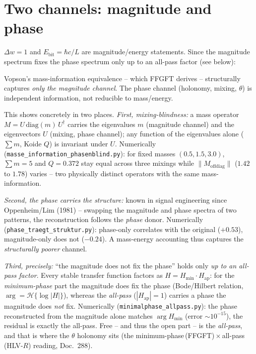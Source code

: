 \section{Two channels: magnitude and phase}
$\Delta w=1$ and $E_\text{bit}=\hbar c/L$ are magnitude/energy statements. Since the magnitude spectrum
fixes the phase spectrum only up to an all-pass factor (see below):

Vopson's mass-information equivalence -- which FFGFT derives -- structurally captures \emph{only the
magnitude channel}. The phase channel (holonomy, mixing, $\theta$) is independent information, not
reducible to mass/energy.

This shows concretely in two places. \emph{First, mixing-blindness:} a mass operator
$M=U\,\mathrm{diag}(m)\,U^{\dagger}$ carries the eigenvalues $m$ (magnitude channel) and the eigenvectors
$U$ (mixing, phase channel); any function of the eigenvalues alone ($\sum m$, Koide $Q$) is invariant
under $U$. Numerically (\texttt{masse\_information\_phasenblind.py}): for fixed masses $(0.5,1.5,3.0)$,
$\sum m=5$ and $Q=0.372$ stay equal across three mixings while $\lVert M_\text{offdiag}\rVert$ ($1.42$ to
$1.78$) varies -- two physically distinct operators with the same mass-information.

\emph{Second, the phase carries the structure:} known in signal engineering since Oppenheim/Lim (1981) --
swapping the magnitude and phase spectra of two patterns, the reconstruction follows the \emph{phase}
donor. Numerically (\texttt{phase\_traegt\_struktur.py}): phase-only correlates with the original
($+0.53$), magnitude-only does not ($-0.24$). A mass-energy accounting thus captures the
\emph{structurally poorer} channel.

\emph{Third, precisely:} \enquote{the magnitude does not fix the phase} holds only \emph{up to an
all-pass factor}. Every stable transfer function factors as $H=H_\text{min}\cdot H_\text{ap}$: for the
\emph{minimum-phase} part the magnitude does fix the phase (Bode/Hilbert relation,
$\arg=\mathcal{H}\{\log|H|\}$), whereas the \emph{all-pass} ($|H_\text{ap}|=1$) carries a phase the
magnitude does \emph{not} fix. Numerically (\texttt{minimalphase\_allpass.py}): the phase reconstructed
from the magnitude alone matches $\arg H_\text{min}$ (error $\sim10^{-15}$), the residual is exactly the
all-pass. Free -- and thus the open part -- is the \emph{all-pass}, and that is where the $\theta$
holonomy sits (the minimum-phase\,(FFGFT)\,$\times$\,all-pass\,(HLV-$R$) reading, Doc.~288).

